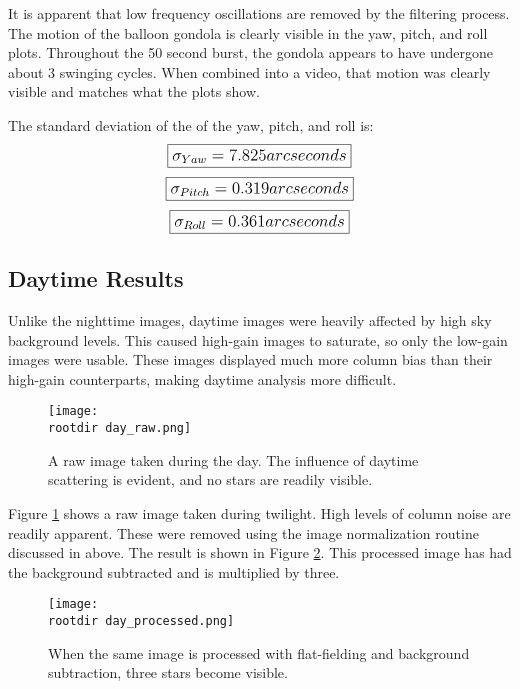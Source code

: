 \documentclass[twocolumn,letterpaper]{IEEEAerospace2012}
\newcommand{\rootdir}{./Figures/}
\begin{document}
It is apparent that low frequency oscillations are removed by the filtering process. The motion of the balloon gondola is clearly visible in the yaw, pitch, and roll plots. Throughout the 50 second burst, the gondola appears to have undergone about 3 swinging cycles. When combined into a video, that motion was clearly visible and matches what the plots show. 

The standard deviation of the of the yaw, pitch, and roll is:
\begin{displaymath}\large
    \boxed{\sigma_{Yaw} = 7.825 arcseconds}
\end{displaymath}
\begin{displaymath}\large
    \boxed{\sigma_{Pitch} = 0.319 arcseconds}
\end{displaymath}
\begin{displaymath}\large
    \boxed{\sigma_{Roll} = 0.361 arcseconds}
\end{displaymath}



\subsection{Daytime Results}

Unlike the nighttime images, daytime images were heavily affected by high sky background levels. This caused high-gain images to saturate, so only the low-gain images were usable. These images displayed much more column bias than their high-gain counterparts, making daytime analysis more difficult. 
\begin{figure}[H]
    \centering
    \texttt{[image: \\rootdir day\_raw.png]}
    \caption{A raw image taken during the day. The influence of daytime scattering is evident, and no stars are readily visible.}
    \label{fig:day_raw}
\end{figure}

Figure \ref{fig:day_raw} shows a raw image taken during twilight. High levels of column noise are readily apparent. These were removed using the image normalization routine discussed in above. The result is shown in Figure \ref{fig:day_processed}. This processed image has had the background subtracted and is multiplied by three.
\begin{figure}[H]
    \centering
    \texttt{[image: \\rootdir day\_processed.png]}
    \caption{When the same image is processed with flat-fielding and background subtraction, three stars become visible.}
    \label{fig:day_processed}
\end{figure}
\end{document}
